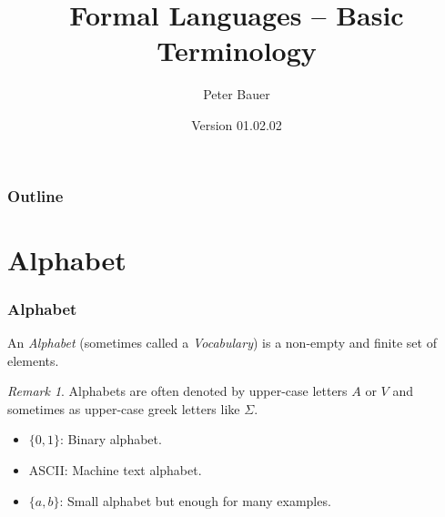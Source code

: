 \documentclass{beamer}
\title{Formal Languages -- Basic Terminology}
\author{Peter Bauer}
\date{Version 01.02.02} %
\theoremstyle{remark}
\newtheorem{remark}[theorem]{Remark}
\begin{document}
\frame{\titlepage}

\begin{frame}
	\frametitle{Outline}
	\tableofcontents
\end{frame}

\section{Alphabet}
\begin{frame}
	\frametitle{Alphabet}
	
	\begin{definition}
		An {\em Alphabet} (sometimes called a {\em Vocabulary}) is a non-empty and finite set of elements.
	\end{definition}
	
	\begin{remark}
		Alphabets are often denoted by upper-case letters $A$ or $V$ and sometimes as upper-case greek letters like $\Sigma$.
	\end{remark}
	
	\pause
	
	\begin {example}
		\begin{itemize}
			\item $\{0, 1\}$: Binary alphabet.
			\item ASCII: Machine text alphabet.
			\item $\{a, b\}$: Small alphabet but enough for many examples.
		\end{itemize}
	\end{example}
\end{frame}
\end{document}
